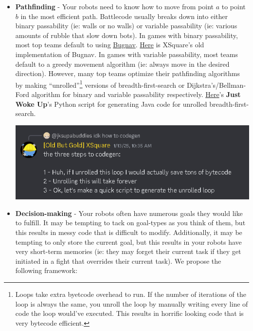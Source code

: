 \begin{enumerate}
\begin{itemize}
      \item \textbf{Pathfinding} - Your robots need to know how to move from point $a$ to point $b$ in the most efficient path. Battlecode usually breaks down into either binary passability (ie: walls or no walls) or variable passability (ie: various amounts of rubble that slow down bots). In games with binary passability, most top teams default to using \href{https://www.cs.cmu.edu/~motionplanning/lecture/Chap2-Bug-Alg_howie.pdf}{Bugnav}. \href{https://github.com/IvanGeffner/BTC24/blob/master/BugPath.java}{Here} is XSquare's old implementation of Bugnav. In games with variable passability, most teams default to a greedy movement algorithm (ie: always move in the desired direction). However, many top teams optimize their pathfinding algorithms by making ``unrolled''\footnote{Loops take extra byetcode overhead to run. If the number of iterations of the loop is always the same, you unroll the loop by manually writing every line of code the loop would've executed. This results in horrific looking code that is very bytecode efficient.} versions of breadth-first-search or Dijkstra's/Bellman-Ford algorithm for binary and variable passability respectively. \href{https://github.com/Tim-gubski/BattleCode2025/blob/main/scripts/pathfind.py}{Here}'s \textbf{Just Woke Up}'s Python script for generating Java code for unrolled breadth-first-search.
      \begin{center}
          \includegraphics[scale=0.5]{images/unroll.png}
      \end{center}
      \item \textbf{Decision-making} - Your robots often have numerous goals they would like to fulfill. It may be tempting to tack on goal-types as you think of them, but this results in messy code that is difficult to modify. Additionally, it may be tempting to only store the current goal, but this results in your robots have very short-term memories (ie: they may forget their current task if they get initiated in a fight that overrides their current task). We propose the following framework:

    \medskip
      

\end{itemize}
\end{enumerate}
